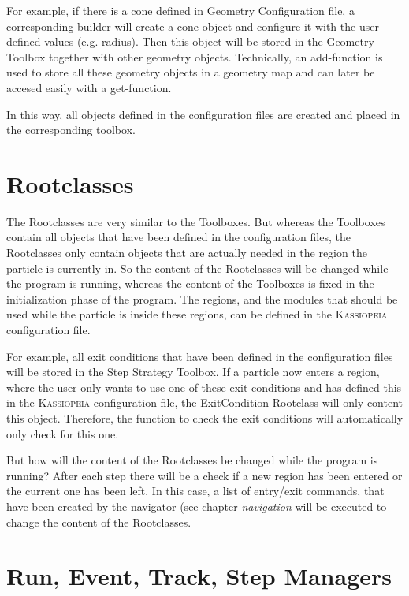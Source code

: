 For example, if there is a cone defined in Geometry Configuration file, a corresponding builder will create a cone object and configure it with the user defined values (e.g. radius). Then this object will be stored in the Geometry Toolbox together with other geometry objects. Technically, an add-function is used to store all these geometry objects in a geometry map and can later be accesed easily with a get-function.

In this way, all objects defined in the configuration files are created and placed in the corresponding toolbox.


\section{Rootclasses}

The Rootclasses are very similar to the Toolboxes. But whereas the Toolboxes contain all objects that have been defined in the configuration files, the Rootclasses only contain objects that are actually needed in the region the particle is currently in. So the content of the Rootclasses will be changed while the program is running, whereas the content of the Toolboxes is fixed in the initialization phase of the program. The regions, and the modules that should be used while the particle is inside these regions, can be defined in the \textsc{Kassiopeia} configuration file.

For example, all exit conditions that have been defined in the configuration files will be stored in the Step Strategy Toolbox. If a particle now enters a region, where the user only wants to use one of these exit conditions and has defined this in the \textsc{Kassiopeia} configuration file, the ExitCondition Rootclass will only content this object. Therefore, the function to check the exit conditions will automatically only check for this one.

But how will the content of the Rootclasses be changed while the program is running? After each step there will be a check if a new region has been entered or the current one has been left. In this case, a list of entry/exit commands, that have been created by the navigator (see chapter \textit{navigation} will be executed to change the content of the Rootclasses.


\section{Run, Event, Track, Step Managers}


